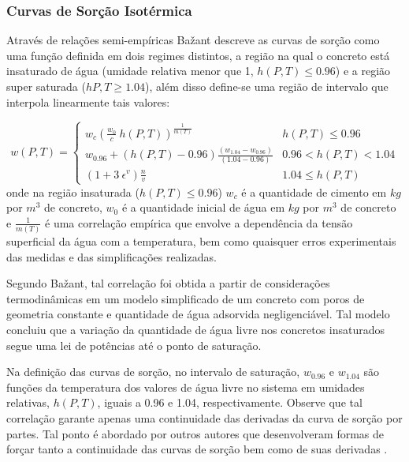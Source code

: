 \subsubsection{Curvas de Sorção Isotérmica}
Através de relações semi-empíricas Ba\v{z}ant descreve as curvas de sorção como
uma função definida em dois regimes distintos, a região na qual o concreto está
insaturado de água (umidade relativa menor que 1, $h(P, T) \leq 0.96$) e a
região super saturada ($h{P,T} \geq 1.04$), além disso define-se uma região de
intervalo que interpola linearmente tais valores:

\begin{equation}
  \label{eq:baz_phi}
  w(P, T) =
  \begin{cases} 
    w_c \left( \frac{w_0}{c} \ h(P,T) \right)^{\frac{1}{m(T)}} & h(P, T)\leq 0.96 \\
    w_{0.96} + (h(P, T) - 0.96) \frac{(w_{1.04} - w_{0.96})}{(1.04-0.96)} & 0.96 < h(P, T) < 1.04 \\
    (1 + 3 \ \epsilon^v)\frac{n}{v} & 1.04\leq h(P, T)
  \end{cases}
\end{equation}
onde na região insaturada ($h(P, T) \leq 0.96$) $w_c$ é a quantidade de cimento
em $kg$ por $m^3$ de concreto, $w_0$ é a quantidade inicial de água em $kg$ por
$m^3$ de concreto e $\frac{1}{m(T)}$ é uma correlação empírica que envolve a
dependência da tensão superficial da água com a temperatura, bem como quaisquer
erros experimentais das medidas e das simplificações realizadas.

Segundo Ba\v{z}ant, tal correlação foi obtida a partir de considerações
termodinâmicas em um modelo simplificado de um concreto com poros de geometria
constante e quantidade de água adsorvida negligenciável. Tal modelo concluiu que
a variação da quantidade de água livre nos concretos insaturados segue uma lei
de potências até o ponto de saturação.

Na definição das curvas de sorção, no intervalo de saturação, $w_{0.96}$ e
$w_{1.04}$ são funções da temperatura dos valores de água livre no sistema em
umidades relativas, $h(P, T)$, iguais a 0.96 e 1.04, respectivamente. Observe
que tal correlação garante apenas uma continuidade das derivadas da curva de
sorção por partes. Tal ponto é abordado por outros autores que desenvolveram
formas de forçar tanto a continuidade das curvas de sorção bem como de suas
derivadas \cite{Fey2016b}.

